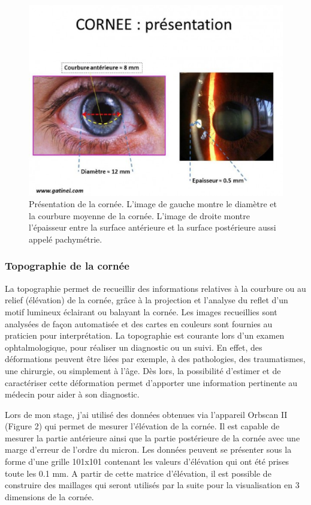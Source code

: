 \documentclass[a4paper,12pt]{article}
\begin{document}
\begin{figure}[h]
	\centering
	\includegraphics[width=15cm, trim=0cm 0cm 0cm 3cm, clip]{CorneePresentation.eps} 
	\caption{Présentation de la cornée. L'image de gauche montre le diamètre et la courbure moyenne de la cornée. L'image de droite montre l'épaisseur entre la surface antérieure et la surface postérieure aussi appelé pachymétrie.}
\end{figure}


		\subsubsection{Topographie de la cornée}
La topographie permet de recueillir des informations relatives à la courbure ou au relief (élévation) de la cornée, grâce à la projection et l'analyse du reflet d'un motif lumineux éclairant ou balayant la cornée. Les images recueillies sont analysées de façon automatisée et des cartes en couleurs sont fournies au praticien pour interprétation. La topographie est courante lors d'un examen ophtalmologique, pour réaliser un diagnostic ou un suivi. En effet, des déformations peuvent être liées par exemple, à des pathologies, des traumatismes, une chirurgie, ou simplement à l'âge. Dès lors, la possibilité d'estimer et de caractériser cette déformation permet d'apporter une information pertinente au médecin pour aider à son diagnostic. 

Lors de mon stage, j'ai utilisé des données obtenues via l'appareil Orbscan II (Figure 2) qui permet de mesurer l'élévation de la cornée. Il est capable de mesurer la partie antérieure ainsi que la partie postérieure de la cornée avec une marge d'erreur de l'ordre du micron. Les données peuvent se présenter sous la forme d'une grille 101x101 contenant les valeurs d'élévation qui ont été prises toute les 0.1 mm. A partir de cette matrice d'élévation, il est possible de construire des maillages qui seront utilisés par la suite pour la visualisation en 3 dimensions de la cornée. 
\end{document}

